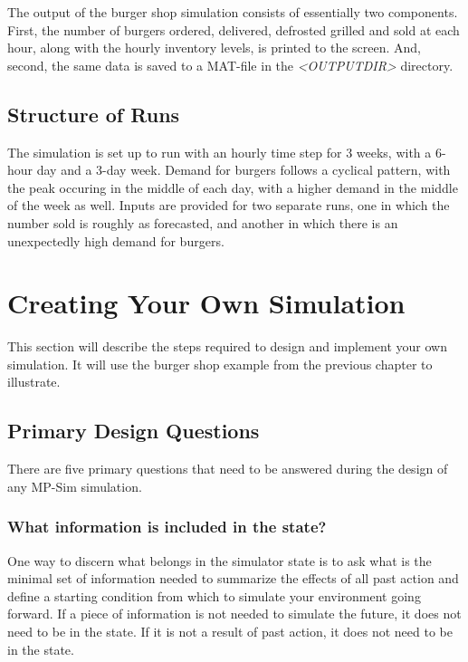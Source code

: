 \documentclass[12pt]{article}
\newcommand{\mpsim}[0]{{MP-Sim}}
\newcommand{\outputdir}[1]{\textsf{\textsl{{\relsize{-1.0}\textless{}\mbox{OUTPUTDIR}\textgreater{}}}}\code{{#1}}}
\newcommand{\code}[1]{{\relsize{-0.5}{\tt{{#1}}}}}  %
\numberwithin{equation}{section}
\numberwithin{table}{section}
\numberwithin{figure}{section}
\begin{document}
The output of the burger shop simulation consists of essentially two components. First, the number of burgers ordered, delivered, defrosted grilled and sold at each hour, along with the hourly inventory levels, is printed to the screen. And, second, the same data is saved to a MAT-file in the \outputdir{/burger\_shop\_example/outputs} directory.

\subsection{Structure of Runs}
\label{sec:burger_structure}

The simulation is set up to run with an hourly time step for 3 weeks, with a 6-hour day and a 3-day week. Demand for burgers follows a cyclical pattern, with the peak occuring in the middle of each day, with a higher demand in the middle of the week as well. Inputs are provided for two separate runs, one in which the number sold is roughly as forecasted, and another in which there is an unexpectedly high demand for burgers.


\clearpage
\section{Creating Your Own Simulation}

This section will describe the steps required to design and implement your own simulation.
It will use the burger shop example from the previous chapter to illustrate.

\subsection{Primary Design Questions}
There are five primary questions that need to be answered during the design of any \mpsim{} simulation.

\subsubsection{What information is included in the state?}

One way to discern what belongs in the simulator state is to ask what is the minimal set of information needed to summarize the effects of all past action and define a starting condition from which to simulate your environment going forward. If a piece of information is not needed to simulate the future, it does not need to be in the state. If it is not a result of past action, it does not need to be in the state.
\end{document}
